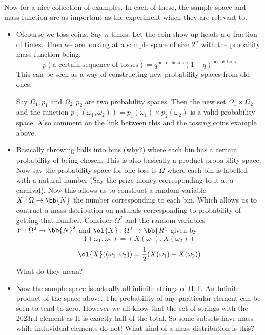 \documentclass{myclass}
\begin{document}
\begin{example}
    Now for a nice collection of examples. In each of these, the sample space and mass function are as important as the experiment which they are relevant to.
    \begin{itemize}
        \item {} Ofcourse we toss coins. Say $n$ times. Let the coin show up heads a q fraction of times. Then we are looking at a sample space of size $2^n$ with the probaility mass function being,
                $$p(\text{a certain sequence of tosses})=q^{\text{no. of heads}}(1-q)^{\text{no. of tails}}$$
             This can be seen as a way of constructing new probability spaces from old ones.
             \begin{exe}
                Say $\Omega_1,p_1$ and $\Omega_2,p_2$ are two probability spaces. Then the new set $\Omega_1\times\Omega_2$ and the function $p((\omega_1,\omega_2))=p_1(\omega_1)\times p_2(\omega_2)$ is a valid probability space.
                Also comment on the link between this and the tossing coins example above.
            \end{exe}
        \item {} Basically throwing balls into bins (why?) where each bin has a certain probability of being chosen. This is also basically a product probability space. \\Now say the probability space for one toss is $\Omega$ where each bin is labelled with a natural number (Say the prize money corresponding to it at a carnival). Now this allows us to construct a random variable $X:\Omega\to \bb{N}$ the number corresponding to each bin.
             Which allows us to contruct a mass dstribution on naturals corresponding to probability of getting that number. Consider $\Omega^2$ and the random variables $Y:\Omega^2\to\bb{N}^2$ and $\ol{X}:\Omega^2\to\bb{R}$ given by $$Y(\omega_1,\omega_2)=(X(\omega_1),X(\omega_2))$$$$\ol{X}((\omega_1,\omega_2))=\frac{1}{2}(X(\omega_1)+X(\omega_2))$$ What do they mean?
        \item{} Now the sample space is actually all infinite strings of H,T. An Infinite product of the space above. The probability of any pariticular element can be seen to tend to zero. However we all know that the set of strings
             with the 2023rd element as H is exactly half of the total. So some subsets have mass while induvidual elements do not! What kind of a mass distribution is this?
    \end{itemize}
\end{example}
\end{document}
